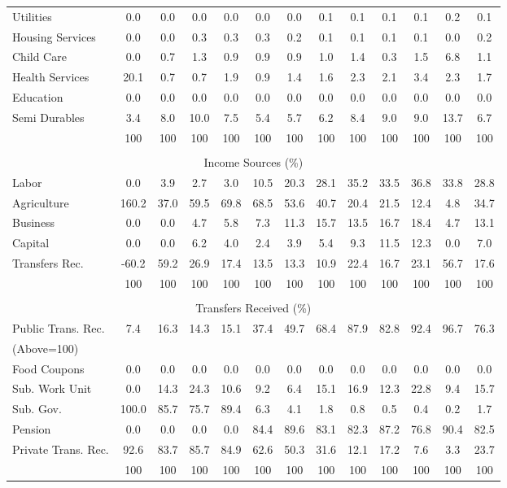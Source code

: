 \begin{tabular}{l c c c| c c c c c| c c c| c}
Utilities    & 0.0 & 0.0 & 0.0 & 0.0 & 0.0 & 0.0 & 0.1 & 0.1 & 0.1 & 0.1 & 0.2 & 0.1 \\
Housing Services  & 0.0 & 0.0 & 0.3 & 0.3 & 0.3 & 0.2 & 0.1 & 0.1 & 0.1 & 0.1 & 0.0 & 0.2 \\
Child Care   & 0.0 & 0.7 & 1.3 & 0.9 & 0.9 & 0.9 & 1.0 & 1.4 & 0.3 & 1.5 & 6.8 & 1.1 \\
Health Services    & 20.1 & 0.7 & 0.7 & 1.9 & 0.9 & 1.4 & 1.6 & 2.3 & 2.1 & 3.4 & 2.3 & 1.7 \\
Education   & 0.0 & 0.0 & 0.0 & 0.0 & 0.0 & 0.0 & 0.0 & 0.0 & 0.0 & 0.0 & 0.0 & 0.0 \\
Semi Durables     & 3.4 & 8.0 & 10.0 & 7.5 & 5.4 & 5.7 & 6.2 & 8.4 & 9.0 & 9.0 & 13.7 & 6.7 \\
\midrule
 & 100 & 100 & 100 & 100 & 100 & 100 & 100 & 100 & 100 & 100 & 100 & 100 \\
\midrule \\
\multicolumn{13}{c}{Income Sources (\%)}  \\
\midrule
Labor        & 0.0 & 3.9 & 2.7 & 3.0 & 10.5 & 20.3 & 28.1 & 35.2 & 33.5 & 36.8 & 33.8 & 28.8 \\
Agriculture  & 160.2 & 37.0 & 59.5 & 69.8 & 68.5 & 53.6 & 40.7 & 20.4 & 21.5 & 12.4 & 4.8 & 34.7 \\
Business     & 0.0 & 0.0 & 4.7 & 5.8 & 7.3 & 11.3 & 15.7 & 13.5 & 16.7 & 18.4 & 4.7 & 13.1 \\
Capital      & 0.0 & 0.0 & 6.2 & 4.0 & 2.4 & 3.9 & 5.4 & 9.3 & 11.5 & 12.3 & 0.0 & 7.0 \\
Transfers Rec.  & -60.2 & 59.2 & 26.9 & 17.4 & 13.5 & 13.3 & 10.9 & 22.4 & 16.7 & 23.1 & 56.7 & 17.6 \\
\midrule
 & 100 & 100 & 100 & 100 & 100 & 100 & 100 & 100 & 100 & 100 & 100 & 100 \\
\midrule \\
\multicolumn{13}{c}{Transfers Received (\%)}  \\
\midrule
Public Trans. Rec.  & 7.4 & 16.3 & 14.3 & 15.1 & 37.4 & 49.7 & 68.4 & 87.9 & 82.8 & 92.4 & 96.7 & 76.3 \\
(Above=100) & & & & & & & & & & & &  \\
\hspace{.3cm} Food Coupons    & 0.0 & 0.0 & 0.0 & 0.0 & 0.0 & 0.0 & 0.0 & 0.0 & 0.0 & 0.0 & 0.0 & 0.0 \\
\hspace{.3cm} Sub. Work Unit  & 0.0 & 14.3 & 24.3 & 10.6 & 9.2 & 6.4 & 15.1 & 16.9 & 12.3 & 22.8 & 9.4 & 15.7 \\
\hspace{.3cm} Sub. Gov.       & 100.0 & 85.7 & 75.7 & 89.4 & 6.3 & 4.1 & 1.8 & 0.8 & 0.5 & 0.4 & 0.2 & 1.7 \\
\hspace{.3cm} Pension         & 0.0 & 0.0 & 0.0 & 0.0 & 84.4 & 89.6 & 83.1 & 82.3 & 87.2 & 76.8 & 90.4 & 82.5 \\
Private Trans. Rec. & 92.6 & 83.7 & 85.7 & 84.9 & 62.6 & 50.3 & 31.6 & 12.1 & 17.2 & 7.6 & 3.3 & 23.7 \\
\midrule
 & 100 & 100 & 100 & 100 & 100 & 100 & 100 & 100 & 100 & 100 & 100 & 100 \\
\bottomrule
\end{tabular}